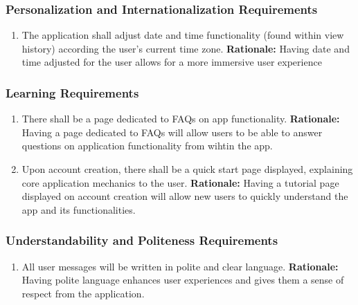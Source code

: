 \documentclass[]{article}
\begin{document}
\subsubsection{Personalization and Internationalization Requirements}
\label{ssub:personalization_and_internationalization_requirements}
\begin{enumerate}[{UH-PI}1. ]
	\item The application shall adjust date and time functionality (found within view history) according the user's current time zone.
	\newline \textbf{Rationale:} Having date and time adjusted for the user allows for a more immersive user experience
\end{enumerate}

\subsubsection{Learning Requirements}
\label{ssub:learning_requirements}
\begin{enumerate}[{UH-L}1. ]
	\item There shall be a page dedicated to FAQs on app functionality.
	\newline \textbf{Rationale:} Having a page dedicated to FAQs will allow users to be able to answer questions on application functionality from wihtin the app.
    \item Upon account creation, there shall be a quick start page displayed, explaining core application mechanics to the user.
    \newline \textbf{Rationale:} Having a tutorial page displayed on account creation will allow new users to quickly understand the app and its functionalities.
\end{enumerate}

\subsubsection{Understandability and Politeness Requirements}
\label{ssub:understandability_and_politeness_requirements}
\begin{enumerate}[{UH-UP}1. ]
	\item All user messages will be written in polite and clear language.
	\newline \textbf{Rationale:} Having polite language enhances user experiences and gives them a sense of respect from the application.
\end{enumerate}
\end{document}
